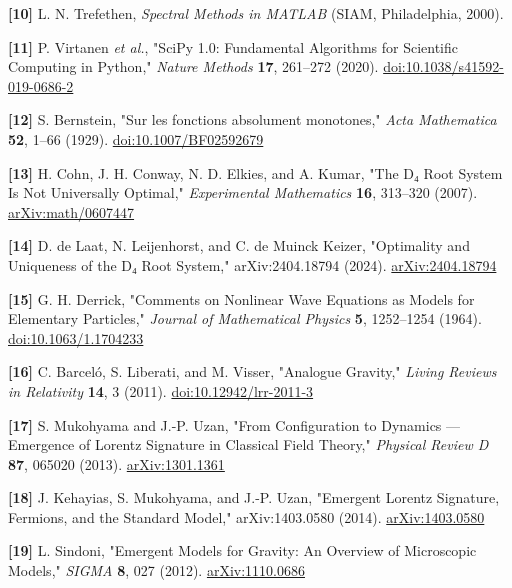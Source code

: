 \documentclass[a4paper,11pt]{article}
\begin{document}
\label{ref10}
\noindent \textbf{[10]} L. N. Trefethen, \textit{Spectral Methods in MATLAB} (SIAM, Philadelphia, 2000).


\label{ref11}
\noindent \textbf{[11]} P. Virtanen \textit{et al.}, "SciPy 1.0: Fundamental Algorithms for Scientific Computing in Python," \textit{Nature Methods} \textbf{17}, 261–272 (2020). \href{https://doi.org/10.1038/s41592-019-0686-2}{doi:10.1038/s41592-019-0686-2}


\label{ref12}
\noindent \textbf{[12]} S. Bernstein, "Sur les fonctions absolument monotones," \textit{Acta Mathematica} \textbf{52}, 1–66 (1929). \href{https://doi.org/10.1007/BF02592679}{doi:10.1007/BF02592679}


\label{ref13}
\noindent \textbf{[13]} H. Cohn, J. H. Conway, N. D. Elkies, and A. Kumar, "The D₄ Root System Is Not Universally Optimal," \textit{Experimental Mathematics} \textbf{16}, 313–320 (2007). \href{https://arxiv.org/abs/math/0607447}{arXiv:math/0607447}


\label{ref14}
\noindent \textbf{[14]} D. de Laat, N. Leijenhorst, and C. de Muinck Keizer, "Optimality and Uniqueness of the D₄ Root System," arXiv:2404.18794 (2024). \href{https://arxiv.org/abs/2404.18794}{arXiv:2404.18794}


\label{ref15}
\noindent \textbf{[15]} G. H. Derrick, "Comments on Nonlinear Wave Equations as Models for Elementary Particles," \textit{Journal of Mathematical Physics} \textbf{5}, 1252–1254 (1964). \href{https://doi.org/10.1063/1.1704233}{doi:10.1063/1.1704233}


\label{ref16}
\noindent \textbf{[16]} C. Barceló, S. Liberati, and M. Visser, "Analogue Gravity," \textit{Living Reviews in Relativity} \textbf{14}, 3 (2011). \href{https://doi.org/10.12942/lrr-2011-3}{doi:10.12942/lrr-2011-3}


\label{ref17}
\noindent \textbf{[17]} S. Mukohyama and J.-P. Uzan, "From Configuration to Dynamics — Emergence of Lorentz Signature in Classical Field Theory," \textit{Physical Review D} \textbf{87}, 065020 (2013). \href{https://arxiv.org/abs/1301.1361}{arXiv:1301.1361}


\label{ref18}
\noindent \textbf{[18]} J. Kehayias, S. Mukohyama, and J.-P. Uzan, "Emergent Lorentz Signature, Fermions, and the Standard Model," arXiv:1403.0580 (2014). \href{https://arxiv.org/abs/1403.0580}{arXiv:1403.0580}


\label{ref19}
\noindent \textbf{[19]} L. Sindoni, "Emergent Models for Gravity: An Overview of Microscopic Models," \textit{SIGMA} \textbf{8}, 027 (2012). \href{https://arxiv.org/abs/1110.0686}{arXiv:1110.0686}
\end{document}
